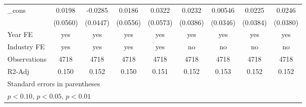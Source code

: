 \begin{table}[htbp]
\begin{tabular}{l*{8}{c}}
\_cons              &      0.0198         &     -0.0285         &      0.0186         &      0.0322         &      0.0232         &     0.00546         &      0.0225         &      0.0246         \\
                    &    (0.0560)         &    (0.0447)         &    (0.0556)         &    (0.0573)         &    (0.0386)         &    (0.0346)         &    (0.0384)         &    (0.0380)         \\
\hline
Year FE             &         yes         &         yes         &         yes         &         yes         &         yes         &         yes         &         yes         &         yes         \\
Industry FE         &         yes         &         yes         &         yes         &         yes         &          no         &          no         &          no         &          no         \\
Observations        &        4718         &        4718         &        4718         &        4718         &        4718         &        4718         &        4718         &        4718         \\
R2-Adj              &       0.150         &       0.152         &       0.150         &       0.151         &       0.152         &       0.153         &       0.152         &       0.152         \\
\hline\hline
\multicolumn{9}{l}{\footnotesize Standard errors in parentheses}\\
\multicolumn{9}{l}{\footnotesize \sym{*} \(p<0.10\), \sym{**} \(p<0.05\), \sym{***} \(p<0.01\)}\\
\end{tabular}
\end{table}
